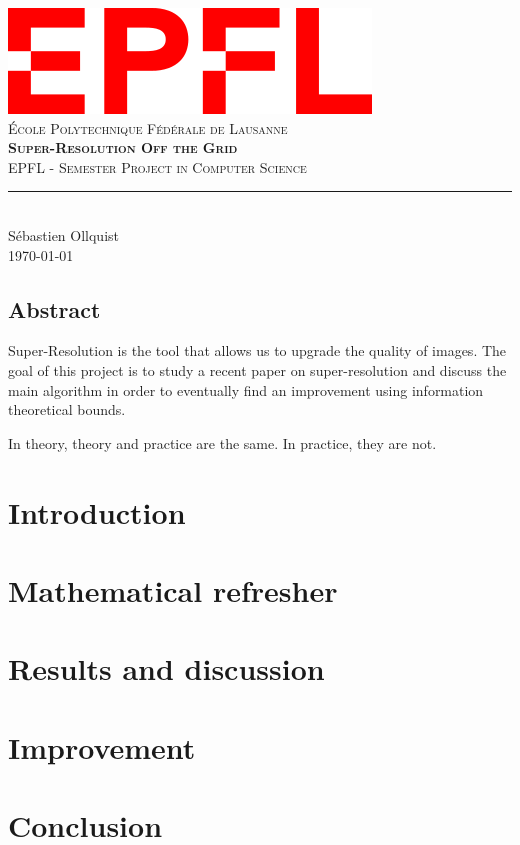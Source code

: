 \documentclass[11pt,titlepage]{report}
\begin{document}
\begin{titlepage}
	\centering
    \includegraphics[width=0.5\linewidth]{images/EPFL.png}\\[0.25cm] 	%
    \textsc{\LARGE École Polytechnique Fédérale de Lausanne}\\ \vspace{\fill}
    \textbf{\textsc{\fontsize{30}{30}\selectfont Super-Resolution Off the Grid}}\\ \vspace{\fill}		
	\textsc{\LARGE EPFL - Semester Project in Computer Science}\\[0.4cm]
	\rule{\linewidth}{0.2 mm} \\[0.5 cm]
	Sébastien Ollquist \\[2cm] \today
\end{titlepage}
\restoregeometry

\thispagestyle{numberonly}
\begin{summary}
\section*{Abstract}
Super-Resolution is the tool that allows us to upgrade the quality of images. The goal of this project is to study a recent paper on super-resolution and discuss the main algorithm in order to eventually find an improvement using information theoretical bounds.
\end{summary}


\begin{fquote}
    In theory, theory and practice are the same. In practice, they are not.
\end{fquote}


\chapter{Introduction}

\chapter{Mathematical refresher}

\chapter{Results and discussion}

\chapter{Improvement}

\chapter{Conclusion}

\clearpage
\pagestyle{numberonly}
\printbibliography
\end{document}
